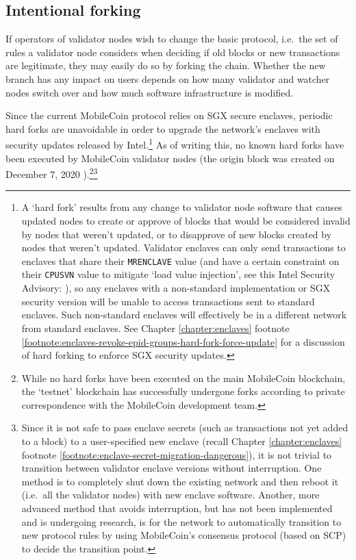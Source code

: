 \subsection{Intentional forking}
\label{subsec:blockchain-intentional-forking}

If operators of validator nodes wish to change the basic protocol, i.e.\ the set of rules a validator node considers when deciding if old blocks or new transactions are legitimate, they may easily do so by forking the chain. Whether the new branch has any impact on users depends on how many validator and watcher nodes switch over and how much software infrastructure is modified.

Since the current MobileCoin protocol relies on SGX secure enclaves, periodic hard forks are unavoidable in order to upgrade the network's enclaves with security updates released by Intel.\footnote{A `hard fork' results from any change to validator node software that causes updated nodes to create or approve of blocks that would be considered invalid by nodes that weren't updated, or to disapprove of new blocks created by nodes that weren't updated. Validator enclaves can only send transactions to enclaves that share their {\tt MRENCLAVE} value (and have a certain constraint on their {\tt CPUSVN} value to mitigate `load value injection', see this Intel Security Advisory: \cite{intel-security-advisory-334-load-value-injection}), so any enclaves with a non-standard implementation or SGX security version will be unable to access transactions sent to standard enclaves. Such non-standard enclaves will effectively be in a different network from standard enclaves. See Chapter \ref{chapter:enclaves} footnote \ref{footnote:enclaves-revoke-epid-groups-hard-fork-force-update} for a discussion of hard forking to enforce SGX security updates.} As of writing this, no known hard forks have been executed by MobileCoin validator nodes (the origin block was created on December 7\nth, 2020 \cite{mobilecoin-launch}).\footnote{While no hard forks have been executed on the main MobileCoin blockchain, the `testnet' blockchain has successfully undergone forks according to private correspondence with the MobileCoin development team.}\footnote{Since it is not safe to pass enclave secrets (such as transactions not yet added to a block) to a user-specified new enclave (recall Chapter \ref{chapter:enclaves} footnote \ref{footnote:enclave-secret-migration-dangerous}), it is not trivial to transition between validator enclave versions without interruption. One method is to completely shut down the existing network and then reboot it (i.e.\ all the validator nodes) with new enclave software. Another, more advanced method that avoids interruption, but has not been implemented and is undergoing research, is for the network to automatically transition to new protocol rules by using MobileCoin's consensus protocol (based on SCP) to decide the transition point.}%

